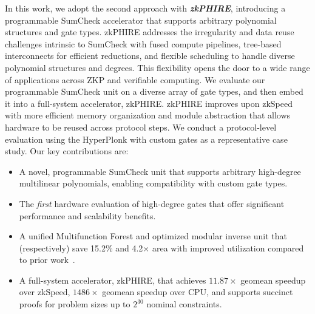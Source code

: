In this work, we adopt the second approach with \textit{\textbf{zkPHIRE}}, introducing a programmable SumCheck accelerator that supports arbitrary polynomial structures and gate types. zkPHIRE addresses the irregularity and data reuse challenges intrinsic to SumCheck with fused compute pipelines, tree-based interconnects for efficient reductions, and flexible scheduling to handle diverse polynomial structures and degrees. This flexibility opens the door to a wide range of applications across ZKP and verifiable computing. We evaluate our programmable SumCheck unit on a diverse array of gate types, and then embed it into a full-system accelerator, zkPHIRE. zkPHIRE improves upon zkSpeed with more efficient memory organization and module abstraction that allows hardware to be reused across protocol steps. We conduct a protocol-level evaluation using the HyperPlonk with custom gates as a representative case study.
Our key contributions are:
\begin{itemize}
    \item A novel, programmable SumCheck unit that supports arbitrary high-degree multilinear polynomials, enabling compatibility with custom gate types.
    \item The \textit{first} hardware evaluation of high-degree gates that offer significant performance and scalability benefits.
    \item A unified Multifunction Forest and optimized modular inverse unit that (respectively) save 15.2\% and 4.2$\times$ area with improved utilization compared to prior work~\cite{zkspeed2025}.
    \item A full-system accelerator, zkPHIRE, that achieves $11.87\times$ geomean speedup over zkSpeed, $1486\times$ geomean speedup over CPU, and supports succinct proofs for problem sizes up to $2^{30}$ nominal constraints.

\end{itemize}

